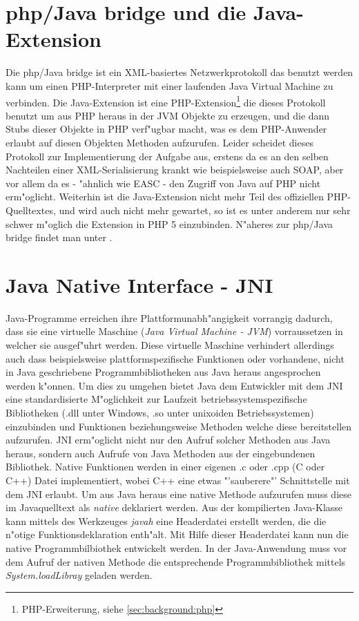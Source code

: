 \section{php/Java bridge und die Java-Extension}
\label{sec:background:bridge}
Die php/Java bridge ist ein XML-basiertes Netzwerkprotokoll das benutzt werden kann um einen PHP-Interpreter mit einer laufenden Java Virtual Machine
zu verbinden.
Die Java-Extension ist eine PHP-Extension\footnote{PHP-Erweiterung, siehe \ref{sec:background:php}} die dieses Protokoll benutzt um aus PHP heraus
in der JVM Objekte zu erzeugen, und die dann Stubs dieser Objekte in PHP verf"ugbar macht, was es dem PHP-Anwender erlaubt auf diesen Objekten
Methoden aufzurufen. Leider scheidet dieses Protokoll zur Implementierung der Aufgabe aus, erstens da es an den selben Nachteilen einer XML-Serialisierung
krankt wie beispielsweise auch SOAP, aber vor allem da es - "ahnlich wie EASC - den Zugriff von Java auf PHP nicht erm"oglicht. Weiterhin ist die
Java-Extension nicht mehr Teil des offiziellen PHP-Quelltextes, und wird auch nicht mehr gewartet, so ist es unter anderem nur sehr schwer
m"oglich die Extension in PHP 5 einzubinden.
N"aheres zur php/Java bridge findet man unter \cite{BRIDGEHP}.

\section{Java Native Interface - JNI}
\label{sec:background:JNI}

Java-Programme erreichen ihre Plattformunabh"angigkeit vorrangig dadurch, dass sie eine virtuelle Maschine (\emph{Java Virtual Machine - JVM}) vorraussetzen in welcher sie
ausgef"uhrt werden. Diese virtuelle Maschine verhindert allerdings auch dass beispielsweise plattformspezifische Funktionen oder vorhandene, nicht in Java
geschriebene Programmbibliotheken aus Java heraus angesprochen werden k"onnen.
Um dies zu umgehen bietet Java dem Entwickler mit dem JNI eine standardisierte M"oglichkeit zur Laufzeit betriebssystemspezifische Bibliotheken 
(.dll unter Windows, .so unter unixoiden Betriebssystemen) einzubinden und Funktionen beziehungsweise Methoden welche diese bereitstellen aufzurufen. 
JNI erm"oglicht nicht nur den Aufruf solcher Methoden aus Java heraus, sondern auch Aufrufe von Java Methoden aus der eingebundenen Bibliothek. 
Native Funktionen werden in einer eigenen .c oder .cpp (C oder C++) Datei implementiert, wobei C++ eine etwas "'sauberere"' Schnittstelle mit dem JNI erlaubt.
Um aus Java heraus eine native Methode aufzurufen muss diese im Javaquelltext als \emph{native} deklariert werden. Aus der kompilierten Java-Klasse kann
mittels des Werkzeuges \emph{javah} eine Headerdatei erstellt werden, die die n"otige Funktionsdeklaration enth"alt. Mit Hilfe dieser Headerdatei kann
nun die native Programmbilbiothek entwickelt werden.
In der Java-Anwendung muss vor dem Aufruf der nativen Methode die entsprechende Programmbibliothek mittels \emph{System.loadLibray} geladen werden.

